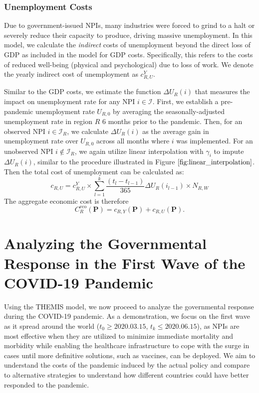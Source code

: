 \documentclass[msom,blindrev]{informs3} %
\begin{document}
\subsubsection*{Unemployment Costs}
Due to government-issued NPIs, many industries were forced to grind to a halt or severely reduce their capacity to produce, driving massive unemployment. In this model, we calculate the \emph{indirect} costs of unemployment beyond the direct loss of GDP as included in the model for GDP costs. Specifically, this refers to the costs of reduced well-being (physical and psychological) due to loss of work. We denote the yearly indirect cost of unemployment as $c_{R,U}^Y$.

Similar to the GDP costs, we estimate the function $\Delta U_R(i)$ that measures the impact on unemployment rate for any NPI $i \in \mathcal{I}$. First, we establish a pre-pandemic unemployment rate $U_{R,0}$ by averaging the seasonally-adjusted unemployment rate in region $R$ 6 months prior to the pandemic. Then, for an observed NPI $i \in \mathcal{I}_R$, we calculate $\Delta U_R(i)$ as the average gain in unemployment rate over $U_{R,0}$ across all months where $i$ was implemented. For an unobserved NPI $i \not \in \mathcal{I}_R$, we again utilize linear interpolation with $\gamma_i$ to impute $\Delta U_R(i)$, similar to the procedure illustrated in Figure $\ref{fig:linear_interpolation}$. Then the total cost of unemployment can be calculated as:
\begin{equation}
    c_{R,U}= c_{R,U}^Y \times \sum_{l=1}^k \frac{(t_l-t_{l-1})}{365} \Delta U_R(i_{l-1}) \times N_{R,W}
\end{equation}
The aggregate economic cost is therefore
\[
C_R^{\mathrm{eco}}(\bm{P})=c_{R,Y}(\bm{P})+c_{R,U}(\bm{P}).
\]
\section{Analyzing the Governmental Response in the First Wave of the COVID-19 Pandemic}
\label{sec:experiment}
Using the THEMIS model, we now proceed to analyze the governmental response during the COVID-19 pandemic. As a demonstration, we focus on the first wave as it spread around the world ($t_0\geq  2020.03.15$, $t_k\leq 2020.06.15$), as NPIs are most effective when they are utilized to minimize immediate mortality and morbidity while enabling the healthcare infrastructure to cope with the surge in cases until more definitive solutions, such as vaccines, can be deployed.  We aim to understand the costs of the pandemic induced by the actual policy and compare to alternative strategies to understand how different countries could have better responded to the pandemic. 
\end{document}
